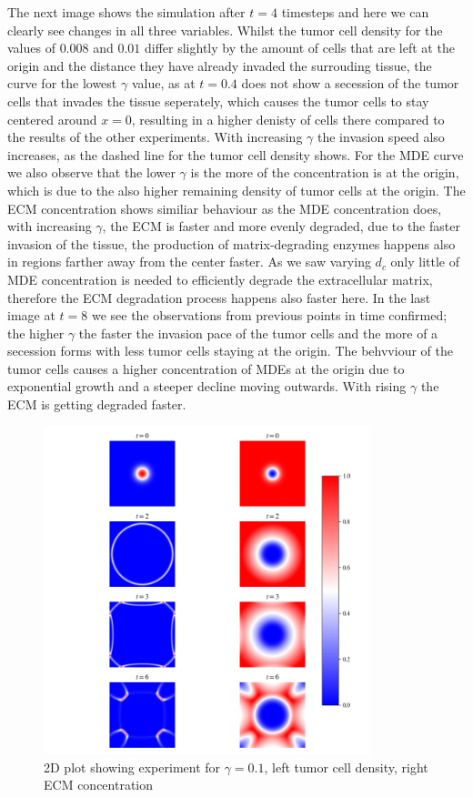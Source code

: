 The next image shows the simulation after $t=4$ timesteps and here we can clearly see changes in all three variables. 
Whilst the tumor cell density for the values of $0.008$ and $0.01$ differ slightly by the amount of cells that are left at the origin and the distance they have already invaded the surrouding tissue, the curve for the lowest $\gamma$ value, as at $t=0.4$ does not show a secession of the tumor cells that invades the tissue seperately, which causes the tumor cells to stay centered around $x=0$, resulting in a higher denisty of cells there compared to the results of the other experiments. With increasing $\gamma$ the invasion speed also increases, as the dashed line for the tumor cell density shows. For the MDE curve we also observe that the lower $\gamma$ is the more of the concentration is at the origin, which is due to the also higher remaining density of tumor cells at the origin. The ECM concentration shows similiar behaviour as the MDE concentration does, with increasing $\gamma$, the ECM is faster and more evenly degraded, due to the faster invasion of the tissue, the production of matrix-degrading enzymes happens also in regions farther away from the center faster. As we saw varying $d_c$ only little of MDE concentration is needed to efficiently degrade the extracellular matrix, therefore the ECM degradation process happens also faster here.\newline
In the last image at $t=8$ we see the observations from previous points in time confirmed; the higher $\gamma$ the faster the invasion pace of the tumor cells and the more of a secession forms with less tumor cells staying at the origin. The behvviour of the tumor cells causes a higher concentration of MDEs at the origin due to exponential growth and a steeper decline moving outwards. With rising $\gamma$ the ECM is getting degraded faster.\newline 
\begin{figure}[h!]
    \centering
    \includegraphics[width=0.85\textwidth]{resources/images/gamma_2D_plot.png}
    \caption{2D plot showing experiment for $\gamma=0.1$, left tumor cell density, right ECM concentration}
    \label{fig:gamma_2D_plot}
\end{figure}
